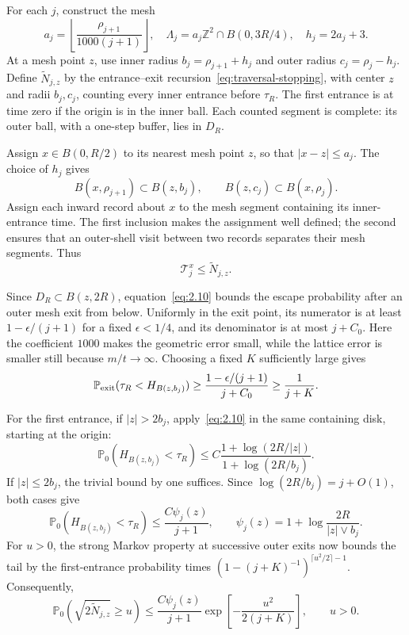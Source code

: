 \documentclass[11pt,a4paper]{article}
\numberwithin{equation}{section}
\theoremstyle{remark}
\begin{document}
For each $j$, construct the mesh
\[
a_j=\left\lfloor\frac{\rho_{j+1}}{1000(j+1)}\right\rfloor,
\quad \Lambda_j=a_j\mathbb Z^2\cap B(0,3R/4),
\quad h_j=2a_j+3.
\]
At a mesh point $z$, use inner radius $b_j=\rho_{j+1}+h_j$ and outer radius $c_j=\rho_j-h_j$. Define $\widetilde N_{j,z}$ by the entrance--exit recursion~\eqref{eq:traversal-stopping}, with center $z$ and radii $b_j,c_j$, counting every inner entrance before $\tau_R$. The first entrance is at time zero if the origin is in the inner ball. Each counted segment is complete: its outer ball, with a one-step buffer, lies in $D_R$.

Assign $x\in B(0,R/2)$ to its nearest mesh point $z$, so that $|x-z|\le a_j$. The choice of $h_j$ gives
\[
B(x,\rho_{j+1})\subset B(z,b_j),
\qquad B(z,c_j)\subset B(x,\rho_j).
\]
Assign each inward record about $x$ to the mesh segment containing its inner-entrance time. The first inclusion makes the assignment well defined; the second ensures that an outer-shell visit between two records separates their mesh segments. Thus
\begin{equation}\label{eq:4.13}
\mathcal T_j^x\le\widetilde N_{j,z}.
\end{equation}

Since $D_R\subset B(z,2R)$, equation~\eqref{eq:2.10} bounds the escape probability after an outer mesh exit from below. Uniformly in the exit point, its numerator is at least
$1-\epsilon/(j+1)$ for a fixed $\epsilon<1/4$, and its denominator is at most $j+C_0$. Here the coefficient $1000$ makes the geometric error small, while the lattice error is smaller still because $m/t\to\infty$. Choosing a fixed $K$ sufficiently large gives
\[
\mathbb P_{\rm exit}(\tau_R<H_{B(z,b_j)})
\ge\frac{1-\epsilon/(j+1)}{j+C_0}
\ge\frac1{j+K}.
\]

For the first entrance, if $|z|>2b_j$, apply~\eqref{eq:2.10} in the same containing disk, starting at the origin:
\[
\mathbb P_0(H_{B(z,b_j)}<\tau_R)
\le C\frac{1+\log(2R/|z|)}{1+\log(2R/b_j)}.
\]
If $|z|\le2b_j$, the trivial bound by one suffices. Since
$\log(2R/b_j)=j+O(1)$, both cases give
\[
\mathbb P_0(H_{B(z,b_j)}<\tau_R)
\le\frac{C\psi_j(z)}{j+1},
\qquad
\psi_j(z)=1+\log\frac{2R}{|z|\vee b_j}.
\]
For $u>0$, the strong Markov property at successive outer exits now bounds the tail by the first-entrance probability times
$(1-(j+K)^{-1})^{\lceil u^2/2\rceil-1}$. Consequently,
\begin{equation}\label{eq:4.14}
\mathbb P_0(\sqrt{2\widetilde N_{j,z}}\ge u)
\le\frac{C\psi_j(z)}{j+1}
\exp\left[-\frac{u^2}{2(j+K)}\right],
\qquad u>0.
\end{equation}
\end{document}
